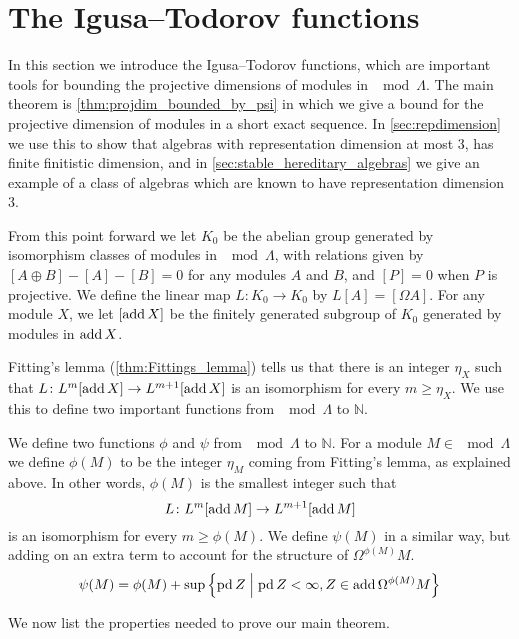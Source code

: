 \section{The Igusa--Todorov functions} \label{sec:Igusa-Todorov}

In this section we introduce the Igusa--Todorov functions, which are important tools for bounding the projective dimensions of modules in $\mod \Lambda$. The main theorem is \cref{thm:projdim_bounded_by_psi} in which we give a bound for the projective dimension of modules in a short exact sequence. In \cref{sec:repdimension} we use this to show that algebras with representation dimension at most 3, has finite finitistic dimension, and in \cref{sec:stable_hereditary_algebras} we give an example of a class of algebras which are known to have representation dimension 3.

From this point forward we let $K_0$ be the abelian group generated by isomorphism classes of modules in $\mod\Lambda$, with relations given by $[A\oplus B] - [A] - [B] = 0$ for any modules $A$ and $B$, and $[P]=0$ when $P$ is projective. We define the linear map $L\colon K_0\to K_0$ by $L[A] = [\Omega A]$. For any module $X$, we let $[\operatorname{add} X]$ be the finitely generated subgroup of $K_0$ generated by modules in $\operatorname{add} X$. 

Fitting's lemma (\cref{thm:Fittings_lemma}) tells us that there is an integer $\eta_X$ such that $L\colon L^m[\operatorname{add} X] \to L^{m+1}[\operatorname{add} X]$ is an isomorphism for every $m \geq \eta_X$. We use this to define two important functions from $\mod \Lambda$ to $\mathbb N$.

\begin{defn}
	We define two functions $\phi$ and $\psi$ from $\mod\Lambda$ to $\mathbb N$. For a module $M \in \mod\Lambda$ we define $\phi(M)$ to be the integer $\eta_M$ coming from Fitting's lemma, as explained above. In other words, $\phi(M)$ is the smallest integer such that $$L\colon L^m[\operatorname{add} M] \to L^{m+1}[\operatorname{add} M]$$ is an isomorphism for every $m \geq \phi(M)$. We define $\psi(M)$ in a similar way, but adding on an extra term to account for the structure of $\Omega^{\phi(M)}M$. 
	$$\psi(M) = \phi(M) + \sup\left\lbrace\operatorname{pd} Z \; \middle| \; \operatorname{pd} Z < \infty, Z \in \operatorname{add} \Omega^{\phi(M)}M\right\rbrace$$
\end{defn}

We now list the properties needed to prove our main theorem.


